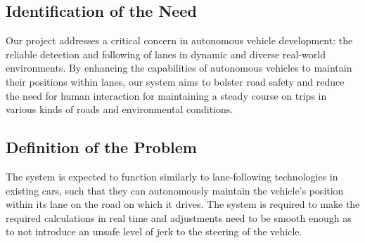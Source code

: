 \documentclass[titlepage, draft]{article}
\begin{document}
\subsection{Identification of the Need}
Our project addresses a critical concern in autonomous vehicle development: the reliable detection and following of lanes in dynamic and diverse real-world environments. By enhancing the capabilities of autonomous vehicles to maintain their positions within lanes, our system aims to bolster road safety and reduce the need for human interaction for maintaining a steady course on trips in various kinds of roads and environmental conditions.


\subsection{Definition of the Problem}
The system is expected to function similarly to lane-following technologies in existing cars, such that they can autonomously maintain the vehicle's position within its lane on the road on which it drives. The system is required to make the required calculations in real time and adjustments need to be smooth enough as to not introduce an unsafe level of jerk to the steering of the vehicle.
\end{document}
